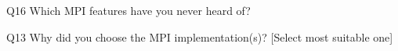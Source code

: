 \begin{description}%
\item{Q16} Which MPI features have you never heard of?%
\item{Q13} Why did you choose the MPI implementation(s)? [Select most suitable one]%
\end{description}%
